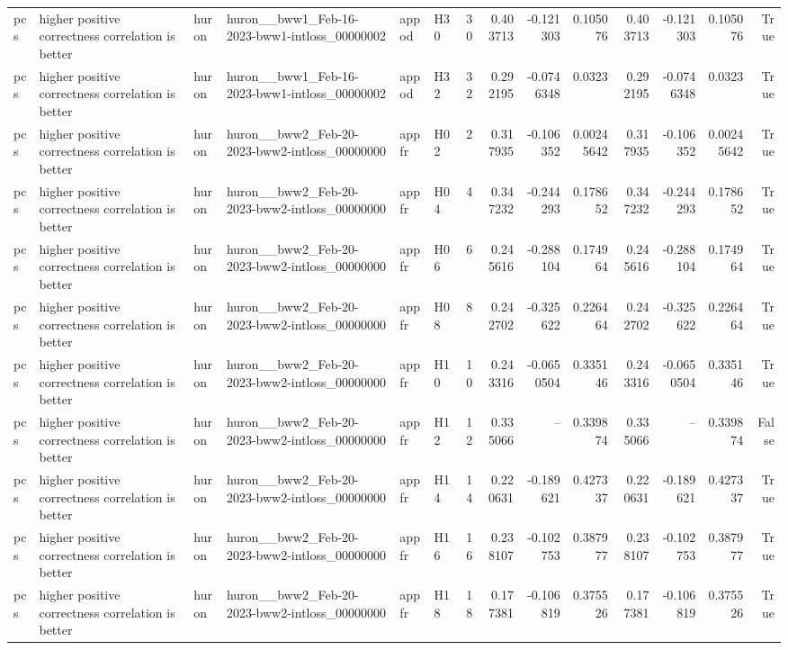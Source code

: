 \begin{longtable}{llllllrrrrrrrr}
pcs & higher positive correctness correlation is better & huron & huron\_\_bww1\_Feb-16-2023-bww1-intloss\_00000002 & appod & H30 & 30 & 0.403713 & -0.121303 & 0.105076 & 0.403713 & -0.121303 & 0.105076 & True \\
pcs & higher positive correctness correlation is better & huron & huron\_\_bww1\_Feb-16-2023-bww1-intloss\_00000002 & appod & H32 & 32 & 0.292195 & -0.0746348 & 0.0323 & 0.292195 & -0.0746348 & 0.0323 & True \\
pcs & higher positive correctness correlation is better & huron & huron\_\_bww2\_Feb-20-2023-bww2-intloss\_00000000 & appfr & H02 & 2 & 0.317935 & -0.106352 & 0.00245642 & 0.317935 & -0.106352 & 0.00245642 & True \\
pcs & higher positive correctness correlation is better & huron & huron\_\_bww2\_Feb-20-2023-bww2-intloss\_00000000 & appfr & H04 & 4 & 0.347232 & -0.244293 & 0.178652 & 0.347232 & -0.244293 & 0.178652 & True \\
pcs & higher positive correctness correlation is better & huron & huron\_\_bww2\_Feb-20-2023-bww2-intloss\_00000000 & appfr & H06 & 6 & 0.245616 & -0.288104 & 0.174964 & 0.245616 & -0.288104 & 0.174964 & True \\
pcs & higher positive correctness correlation is better & huron & huron\_\_bww2\_Feb-20-2023-bww2-intloss\_00000000 & appfr & H08 & 8 & 0.242702 & -0.325622 & 0.226464 & 0.242702 & -0.325622 & 0.226464 & True \\
pcs & higher positive correctness correlation is better & huron & huron\_\_bww2\_Feb-20-2023-bww2-intloss\_00000000 & appfr & H10 & 10 & 0.243316 & -0.0650504 & 0.335146 & 0.243316 & -0.0650504 & 0.335146 & True \\
pcs & higher positive correctness correlation is better & huron & huron\_\_bww2\_Feb-20-2023-bww2-intloss\_00000000 & appfr & H12 & 12 & 0.335066 & -- & 0.339874 & 0.335066 & -- & 0.339874 & False \\
pcs & higher positive correctness correlation is better & huron & huron\_\_bww2\_Feb-20-2023-bww2-intloss\_00000000 & appfr & H14 & 14 & 0.220631 & -0.189621 & 0.427337 & 0.220631 & -0.189621 & 0.427337 & True \\
pcs & higher positive correctness correlation is better & huron & huron\_\_bww2\_Feb-20-2023-bww2-intloss\_00000000 & appfr & H16 & 16 & 0.238107 & -0.102753 & 0.387977 & 0.238107 & -0.102753 & 0.387977 & True \\
pcs & higher positive correctness correlation is better & huron & huron\_\_bww2\_Feb-20-2023-bww2-intloss\_00000000 & appfr & H18 & 18 & 0.177381 & -0.106819 & 0.375526 & 0.177381 & -0.106819 & 0.375526 & True \\

\end{longtable}
